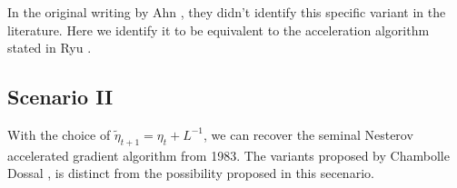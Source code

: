 \documentclass[12pt]{article}
\begin{document}
        \begin{remark}
            In the original writing by Ahn \cite[equation (4.9)]{ahn_understanding_2022}, they didn't identify this specific variant in the literature. 
            Here we identify it to be equivalent to the acceleration algorithm stated in Ryu \cite[algorithm 12.1]{ryu_large-scale_2022}. 
        \end{remark}

    \subsection{Scenario II}\label{sec:scenario_ii}
        With the choice of $\tilde \eta_{t + 1} = \eta_t + L^{-1}$, we can recover the seminal Nesterov accelerated gradient algorithm from 1983. 
        The variants proposed by Chambolle Dossal \cite{chambolle_convergence_2015}, is distinct from the possibility proposed in this secenario. 
\end{document}
